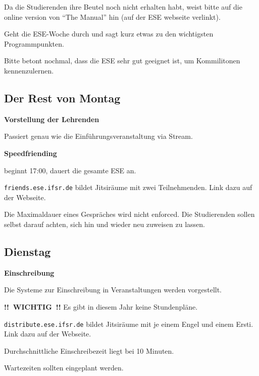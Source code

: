\documentclass[a4paper,12pt]{scrreprt}
\begin{document}
\begin{itemize*}
    \item Da die Studierenden ihre Beutel noch nicht erhalten habt, weist bitte auf die online version von \enquote{The Manual} hin (auf der ESE webseite verlinkt).
    \item Geht die ESE-Woche durch und sagt kurz etwas zu den wichtigsten Programmpunkten.
    \item Bitte betont nochmal, dass die ESE sehr gut geeignet ist, um Kommilitonen kennenzulernen.
\end{itemize*}


\subsection{Der Rest von Montag}

\textbf{Vorstellung der Lehrenden}
\begin{itemize*}
    \item Passiert genau wie die Einführungsveranstaltung via Stream.
\end{itemize*}

\textbf{Speedfriending}
\begin{itemize*}
    \item beginnt 17:00, dauert die gesamte ESE an.
    \item \texttt{friends.ese.ifsr.de} bildet Jitsiräume mit zwei Teilnehmenden. Link dazu auf der Webseite.
    \item Die Maximaldauer eines Gespräches wird nicht enforced. Die Studierenden sollen selbst darauf achten, sich hin und wieder neu zuweisen zu lassen.
\end{itemize*}


\subsection{Dienstag}

\textbf{Einschreibung}
\begin{itemize*}
    \item Die Systeme zur Einschreibung in Veranstaltungen werden vorgestellt.
    \item \textbf{!!~WICHTIG~!!} Es gibt in diesem Jahr keine Stundenpläne.
    \item \texttt{distribute.ese.ifsr.de} bildet Jitsiräume mit je einem Engel und einem Ersti. Link dazu auf der Webseite.
    \item Durchschnittliche Einschreibezeit liegt bei 10 Minuten.
    \item Wartezeiten sollten eingeplant werden.
\end{itemize*}
\end{document}
